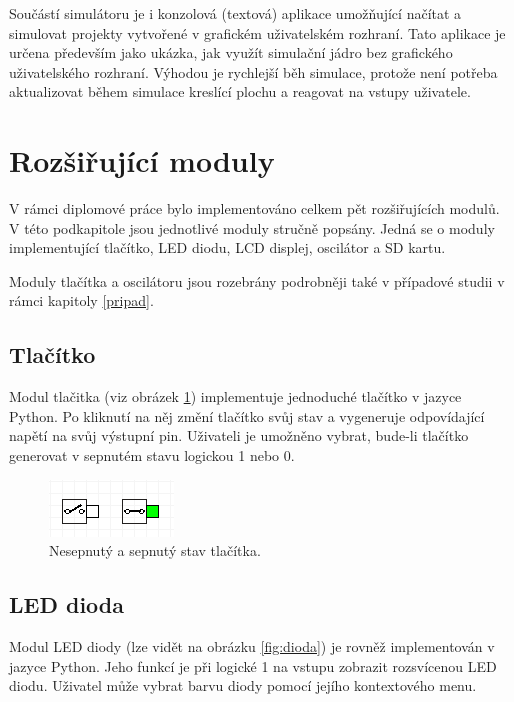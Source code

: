 Součástí simulátoru je i konzolová (textová) aplikace umožňující načítat a simulovat projekty vytvořené v grafickém uživatelském rozhraní. Tato aplikace je určena především jako ukázka, jak využít simulační jádro bez grafického uživatelského rozhraní. Výhodou je rychlejší běh simulace, protože není potřeba aktualizovat během simulace kreslící plochu a reagovat na vstupy uživatele.

\section{Rozšiřující moduly}

V rámci diplomové práce bylo implementováno celkem pět rozšiřujících modulů. V této podkapitole jsou jednotlivé moduly stručně popsány. Jedná se o moduly implementující tlačítko, LED diodu, LCD displej, oscilátor a SD kartu.

Moduly tlačítka a oscilátoru jsou rozebrány podrobněji také v případové studii v rámci kapitoly \ref{pripad}.

\subsection{Tlačítko}

Modul tlačitka (viz obrázek \ref{fig:tlacitko}) implementuje jednoduché tlačítko v jazyce Python. Po kliknutí na něj změní tlačítko svůj stav a vygeneruje odpovídající napětí na svůj výstupní pin. Uživateli je umožněno vybrat, bude-li tlačítko generovat v sepnutém stavu logickou 1 nebo 0.

\begin{figure}[ht]
\centering
\includegraphics[trim=0cm 0cm 0cm 0cm, scale=1]{fig/button}
\caption{Nesepnutý a sepnutý stav tlačítka.}
\label{fig:tlacitko}
\end{figure}

\subsection{LED dioda}

Modul LED diody (lze vidět na obrázku \ref{fig:dioda}) je rovněž implementován v jazyce Python. Jeho funkcí je při logické 1 na vstupu zobrazit rozsvícenou LED diodu. Uživatel může vybrat barvu diody pomocí jejího kontextového menu.

